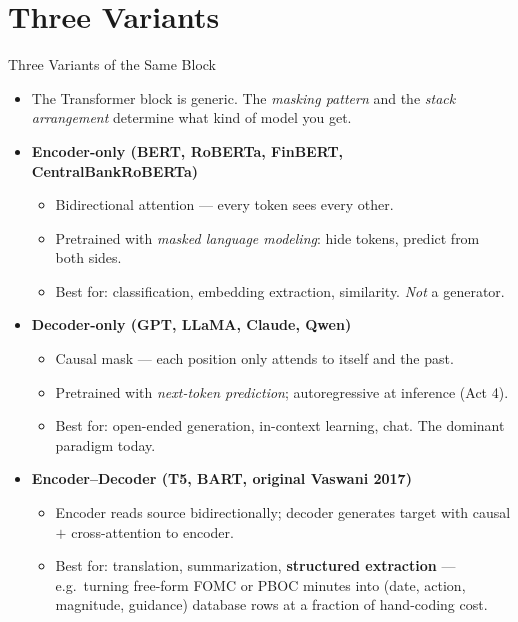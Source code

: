 \section{Three Variants}

\begin{frame}{Three Variants of the Same Block}
\begin{itemize}
\item The Transformer block is generic. The \emph{masking pattern} and the \emph{stack arrangement} determine what kind of model you get.

\medskip
\item \textbf{Encoder-only (BERT, RoBERTa, FinBERT, CentralBankRoBERTa)}
\begin{itemize}
    \item Bidirectional attention --- every token sees every other.
    \item Pretrained with \emph{masked language modeling}: hide tokens, predict from both sides.
    \item Best for: classification, embedding extraction, similarity. \emph{Not} a generator.
\end{itemize}

\medskip
\item \textbf{Decoder-only (GPT, LLaMA, Claude, Qwen)}
\begin{itemize}
    \item Causal mask --- each position only attends to itself and the past.
    \item Pretrained with \emph{next-token prediction}; autoregressive at inference (Act 4).
    \item Best for: open-ended generation, in-context learning, chat. The dominant paradigm today.
\end{itemize}

\medskip
\item \textbf{Encoder--Decoder (T5, BART, original Vaswani 2017)}
\begin{itemize}
    \item Encoder reads source bidirectionally; decoder generates target with causal $+$ cross-attention to encoder.
    \item Best for: translation, summarization, \textbf{structured extraction} --- e.g.\ turning free-form FOMC or PBOC minutes into (date, action, magnitude, guidance) database rows at a fraction of hand-coding cost.
\end{itemize}
\end{itemize}
\end{frame}

